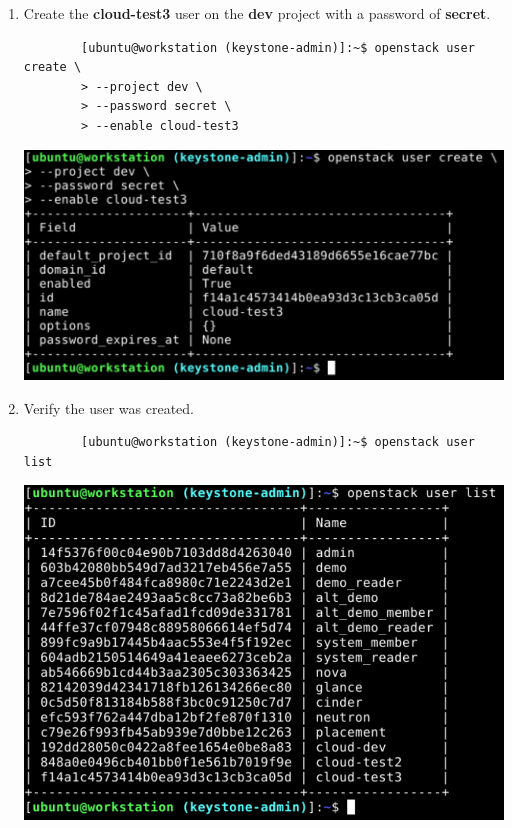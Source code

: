 \documentclass[letterpaper, 12pt]{article}
\begin{document}
\begin{enumerate}
    \item Create the \textbf{cloud-test3} user on the \textbf{dev} project with a password of \textbf{secret}.
    \begin{lstlisting}
        [ubuntu@workstation (keystone-admin)]:~$ openstack user create \
        > --project dev \
        > --password secret \
        > --enable cloud-test3
    \end{lstlisting}

    \begin{center}
        \includegraphics[width=\linewidth]{images/part4/step4.png}
    \end{center}

    \item Verify the user was created.
    \begin{lstlisting}
        [ubuntu@workstation (keystone-admin)]:~$ openstack user list
    \end{lstlisting}

    \begin{center}
        \includegraphics[width=\linewidth]{images/part4/step5.png}
    \end{center}


\end{enumerate}
\end{document}
